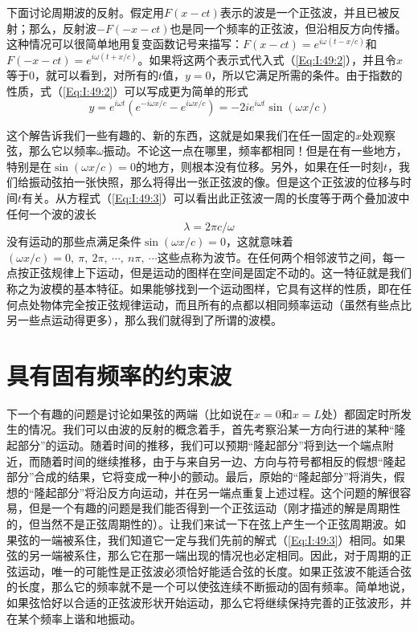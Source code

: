 下面讨论周期波的反射。假定用$F(x-ct)$表示的波是一个正弦波，并且已被反射；那么，反射波$-F(-x-ct)$也是同一个频率的正弦波，但沿相反方向传播。这种情况可以很简单地用复变函数记号来描写：$F(x-ct)=e^{i\omega(t-x/c)}$和$F(-x-ct)=e^{i\omega(t+x/c)}$。如果将这两个表示式代入式（\ref{Eq:I:49:2}），并且令$x$等于0，就可以看到，对所有的$t$值，$y=0$，所以它满足所需的条件。由于指数的性质，式（\ref{Eq:I:49:2}）可以写成更为简单的形式
\begin{equation}
    \label{Eq:I:49:3}
    y =e^{i \omega t}(e^{-i \omega x / c }-e^{i \omega x / c })=-2ie^{i \omega t}\sin(\omega x /c )
\end{equation}

这个解告诉我们一些有趣的、新的东西，这就是如果我们在任一固定的$x$处观察弦，那么它以频率$\omega$振动。不论这一点在哪里，频率都相同！但是在有一些地方，特别是在$\sin(\omega x /c )=0$的地方，则根本没有位移。另外，如果在任一时刻$t$，我们给振动弦拍一张快照，那么将得出一张正弦波的像。但是这个正弦波的位移与时间$t$有关。从方程式（\ref{Eq:I:49:3}）可以看出此正弦波一周的长度等于两个叠加波中任何一个波的波长
\begin{equation}
    \label{Eq:I:49:4}
    \lambda = 2\pi c/\omega
\end{equation}
没有运动的那些点满足条件$\sin(\omega x /c)=0$，这就意味着$(\omega x /c )=0,~\pi,~2\pi,~\cdots,~n \pi,~\cdots$这些点称为波节。在任何两个相邻波节之间，每一点按正弦规律上下运动，但是运动的图样在空间是固定不动的。这一特征就是我们称之为波模的基本特征。如果能够找到一个运动图样，它具有这样的性质，即在任何点处物体完全按正弦规律运动，而且所有的点都以相同频率运动（虽然有些点比另一些点运动得更多），那么我们就得到了所谓的波模。

\section{具有固有频率的约束波}
下一个有趣的问题是讨论如果弦的两端（比如说在$x=0$和$x=L$处）都固定时所发生的情况。我们可以由波的反射的概念着手，首先考察沿某一方向行进的某种“隆起部分”的运动。随着时间的推移，我们可以预期“隆起部分”将到达一个端点附近，而随着时间的继续推移，由于与来自另一边、方向与符号都相反的假想“隆起部分”合成的结果，它将变成一种小的颤动。最后，原始的“隆起部分”将消失，假想的“隆起部分”将沿反方向运动，并在另一端点重复上述过程。这个问题的解很容易，但是一个有趣的问题是我们能否得到一个正弦运动（刚才描述的解是周期性的，但当然不是正弦周期性的）。让我们来试一下在弦上产生一个正弦周期波。如果弦的一端被系住，我们知道它一定与我们先前的解式（\ref{Eq:I:49:3}）相同。如果弦的另一端被系住，那么它在那一端出现的情况也必定相同。因此，对于周期的正弦运动，唯一的可能性是正弦波必须恰好能适合弦的长度。如果正弦波不能适合弦的长度，那么它的频率就不是一个可以使弦连续不断振动的固有频率。简单地说，如果弦恰好以合适的正弦波形状开始运动，那么它将继续保持完善的正弦波形，并在某个频率上谐和地振动。

